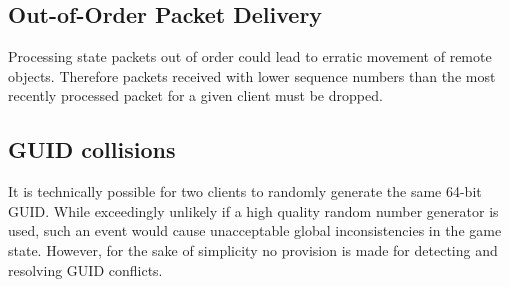 \documentclass{article}
\begin{document}
\subsection{Out-of-Order Packet Delivery}
Processing state packets out of order could lead to erratic movement of
remote objects.  Therefore packets received with lower sequence numbers
than the most recently processed packet for a given client must be
dropped.

\subsection{GUID collisions}
It is technically possible for two clients to randomly generate the same
64-bit GUID.  While exceedingly unlikely if a high quality random number
generator is used, such an event would cause unacceptable global
inconsistencies in the game state.  However, for the sake of simplicity
no provision is made for detecting and resolving GUID conflicts.
\end{document}
